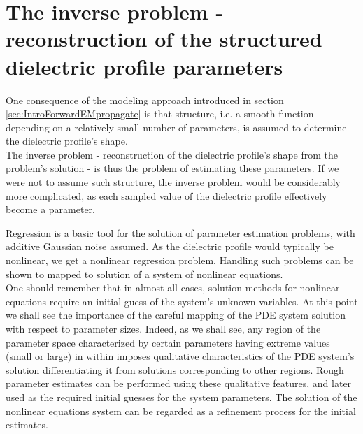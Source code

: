 \documentclass[12pt,twoside]{report}
\begin{document}
\section{The inverse problem - reconstruction of the structured dielectric profile parameters}
One consequence of the modeling approach introduced in section \ref{sec:IntroForwardEMpropagate} is that structure, i.e. a smooth function depending on a relatively small number of parameters, is assumed to determine the dielectric profile's shape. \\
The inverse problem - reconstruction of the dielectric profile's shape from the problem's solution - is thus the problem of estimating these parameters. If we were not to assume such structure, the  inverse problem would be considerably more complicated, as each sampled value of the dielectric profile effectively become a parameter. 

Regression is a basic tool for the solution of parameter estimation problems, with additive Gaussian noise assumed. As the dielectric profile would typically be nonlinear, we get a nonlinear regression problem.
Handling such problems can be shown to mapped to solution of a system of nonlinear equations. \\
One should remember that in almost all cases, solution methods for nonlinear equations require an initial guess of the system's unknown variables. At this point we shall see the importance of the careful mapping of the PDE system solution with respect to parameter sizes. Indeed, as we shall see, any region of the parameter space characterized by certain parameters having extreme values (small or large) in within imposes qualitative characteristics of the PDE system's solution differentiating it from solutions corresponding to other regions. Rough parameter estimates can be performed using these qualitative features, and later used as the required initial guesses for the system parameters. The solution of the nonlinear equations system can be regarded as a refinement process for the initial estimates.
\end{document}
